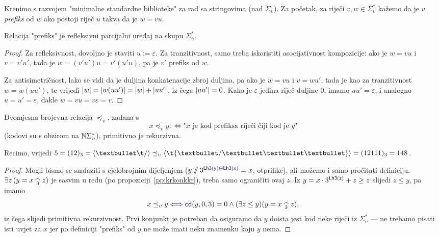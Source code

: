 Krenimo s razvojem "minimalne standardne biblioteke" za rad sa stringovima (nad $\Sigma_\upsilon$). Za početak, za riječi $v,w\in\Sigma_\upsilon^*$ kažemo da je $v$ \emph{prefiks} od $w$ ako postoji riječ $u$ takva da je $w=vu$.

\begin{propozicija}
Relacija "prefiks" je refleksivni parcijalni uređaj na skupu $\Sigma_\upsilon^*$.
\end{propozicija}
\begin{proof}
Za refleksivnost, dovoljno je staviti $u:=\varepsilon$. Za tranzitivnost, samo treba iskoristiti asocijativnost kompozicije: ako je $w=vu$ i $v=v'u'$, tada je $w=(v'u')u=v'(u'u)$, pa je $v'$ prefiks od $w$.

Za antisimetričnost, lako se vidi da je duljina konkatenacije zbroj duljina, pa ako je $w=vu$ i $v=wu'$, tada je kao za tranzitivnost $w=w(uu')$, te vrijedi $\lvert w\rvert=\lvert w(uu')\rvert=\lvert w\rvert+\lvert uu'\rvert$, iz čega $\lvert uu'\rvert=0$. Kako je $\varepsilon$ jedina riječ duljine $0$, imamo $uu'=\varepsilon$, i analogno $u=u'=\varepsilon$, dakle $w=vu=v\varepsilon=v$.
\end{proof}

\begin{lema}
Dvomjesna brojevna relacija $\preceq_\upsilon$, zadana s
\begin{equation}
    x\preceq_\upsilon y:\Longleftrightarrow\text{"$x$ je kod prefiksa riječi čiji kod je $y$"}
\end{equation}
(kodovi su s obzirom na ${\mathbb N}\Sigma_\upsilon^*$), primitivno je rekurzivna.
\end{lema}
Recimo, vrijedi $5=(12)_3=\kr{\text\textbullet\t/}\preceq_\upsilon\kr{\t{\textbullet/\textbullet\textbullet\textbullet}}=(12111)_3=148$.

\begin{proof}
Mogli bismo se snalaziti s cjelobrojnim dijeljenjem ($y\sslash3^{\f{Lh3(y)\ominus Lh3(x)}}=x$, otprilike), ali možemo i samo pročitati definiciju. $\exists z\,(y=x\conc3z)$ je sasvim u redu (po propoziciji~\ref{pp:krkonkkr}), treba samo ograničiti ovaj $z$. Iz $y=x\cdot3^{\f{Lh3(z)}}+z\ge z$ slijedi $z\le y$, pa imamo
\begin{equation}
    x\preceq_\upsilon y\Longleftrightarrow\f{cd}(y,0,3)=0\land(\exists z\le y)(y=x\conc3z)\text,
\end{equation}
iz čega slijedi primitivna rekurzivnost. Prvi konjunkt je potreban da osiguramo da $y$ doista jest kod neke riječi iz $\Sigma_\upsilon^*$ --- ne trebamo pisati isti uvjet za $x$ jer po definiciji "prefiks" od $y$ ne može imati neku znamenku koju $y$ nema.
\end{proof}

